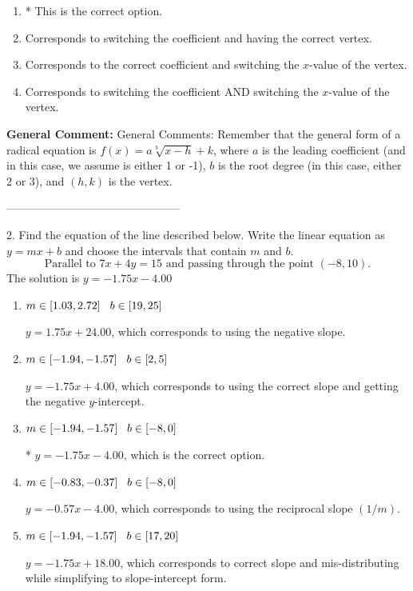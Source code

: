 \documentclass{extbook}[14pt]
\begin{document}
\begin{enumerate}[label=\Alph*.] 
\item * This is the correct option.  
\item Corresponds to switching the coefficient and having the correct vertex.  
\item Corresponds to the correct coefficient and switching the $x$-value of the vertex.  
\item Corresponds to switching the coefficient AND switching the $x$-value of the vertex.  
\end{enumerate} 
 
\textbf{General Comment:} General Comments: Remember that the general form of a radical equation is $ f(x) = a \sqrt[b]{x - h} + k $, where $a$ is the leading coefficient (and in this case, we assume is either 1 or -1), $b$ is the root degree (in this case, either 2 or 3), and $(h, k)$ is the vertex. 

-----------------------------------------------

2. Find the equation of the line described below. Write the linear equation as $ y=mx+b $ and choose the intervals that contain $m$ and $b$.
\[ \text{Parallel to } 7 x + 4 y = 15 \text{ and passing through the point } (-8, 10). \] 
The solution is $ y = -1.75x - 4.00 $ 

\begin{enumerate}[label=\Alph*.] 
\item $ m \in [1.03, 2.72] \hspace*{3mm} b \in [19, 25] $ 

  $y = 1.75x + 24.00$, which corresponds to using the negative slope. 
\item $ m \in [-1.94, -1.57] \hspace*{3mm} b \in [2, 5] $ 

  $y = -1.75x + 4.00$, which corresponds to using the correct slope and getting the negative $y$-intercept. 
\item $ m \in [-1.94, -1.57] \hspace*{3mm} b \in [-8, 0] $ 

 * $y = -1.75x - 4.00$, which is the correct option. 
\item $ m \in [-0.83, -0.37] \hspace*{3mm} b \in [-8, 0] $ 

  $y = -0.57x - 4.00$, which corresponds to using the reciprocal slope $(1/m)$. 
\item $ m \in [-1.94, -1.57] \hspace*{3mm} b \in [17, 20] $ 

  $y = -1.75x + 18.00$, which corresponds to correct slope and mis-distributing while simplifying to slope-intercept form. 
\end{enumerate} 
 
\end{document}
